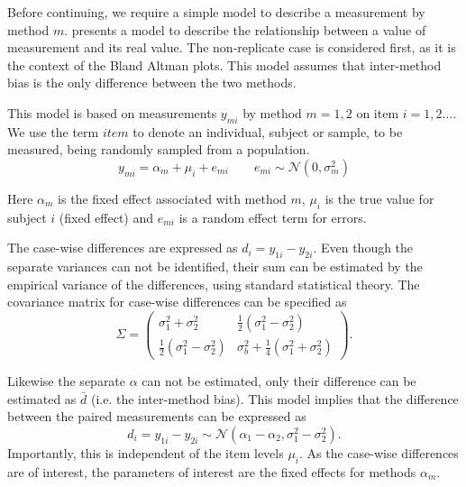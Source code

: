 \documentclass[12pt, a4paper]{report}
\theoremstyle{plain}
\theoremstyle{definition}
\theoremstyle{remark}
\begin{document}
	
Before continuing, we require a simple model to describe a measurement by method $m$. \citet{BXC2004} presents a model to describe the relationship between a value of measurement and its
real value. The non-replicate case is considered first, as it is the context of the Bland Altman plots. This model assumes that inter-method bias is the only difference between the two methods.

This model is based on measurements $y_{mi}$ by method $m=1,2$ on item $i = 1,2 \ldots$. We use the term $item$ to denote an individual, subject or sample, to be measured, being randomly sampled from a population.
\begin{equation}
y_{mi}  = \alpha_{m} + \mu_{i} + e_{mi} \qquad  e_{mi} \sim
\mathcal{N}(0,\sigma^{2}_{m})
\end{equation}
	
Here $\alpha_m$ is the fixed effect associated with method $m$,
 $\mu_i$ is the true value for subject $i$ (fixed effect) and $e_{mi}$ is a random effect term for errors.
	
The case-wise differences are expressed as $d_{i} = y_{1i} - y_{2i}$. Even though the separate variances can not be identified, their sum can be estimated by the empirical variance of the differences, using standard statistical theory. The covariance matrix for case-wise differences can be specified as
\[
\Sigma = \left( \begin{array}{cc}
\sigma^2_1 + \sigma^2_2 &  \frac{1}{2}(\sigma^2_1 - \sigma^2_2) \\
\frac{1}{2}(\sigma^2_1 - \sigma^2_2) &   \sigma^2_b + \frac{1}{4}(\sigma^2_1 + \sigma^2_2)
\end{array}\right).
\]


Likewise the separate $\alpha$ can not be estimated, only their difference can be estimated as $\bar{d}$ (i.e. the inter-method bias). This model implies that the difference between the paired measurements can be expressed as
	\[ d_{i} = y_{1i} - y_{2i} \sim \mathcal{N} (\alpha_{1} - \alpha_{2}, \sigma^2_{1} - \sigma^2_{2}). \]
Importantly, this is independent of the item levels $\mu_i$. As the case-wise differences are of interest, the parameters of interest are the fixed effects for methods $\alpha_{m}$.
	
	
\end{document}
